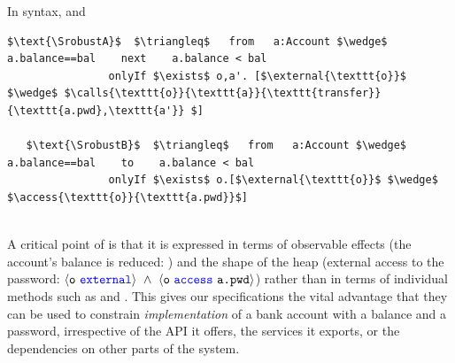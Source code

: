 In \Nec  syntax, and 
 

%
%
%
%
%
%
\begin{lstlisting}[language = Chainmail, mathescape=true, frame=lines]
   $\text{\SrobustA}$  $\triangleq$   from   a:Account $\wedge$ a.balance==bal    next    a.balance < bal
                onlyIf $\exists$ o,a'. [$\external{\texttt{o}}$ $\wedge$ $\calls{\texttt{o}}{\texttt{a}}{\texttt{transfer}}{\texttt{a.pwd},\texttt{a'}} $]    
                
   $\text{\SrobustB}$  $\triangleq$   from   a:Account $\wedge$ a.balance==bal    to    a.balance < bal
                onlyIf $\exists$ o.[$\external{\texttt{o}}$ $\wedge$ $\access{\texttt{o}}{\texttt{a.pwd}}$]    
           
\end{lstlisting}
%
%
% 


A critical point of \SrobustB %
is that it is
expressed in terms of observable effects (the account's balance is
reduced: ) and the shape of the heap 
(external access to the password:
$\external{\prg{o}}\ \wedge\ \access{\prg{o}}{\prg{a.pwd}}$) 
rather than in terms of individual methods such as
 and .
This gives our specifications the
vital advantage that they can be used to constrain
\textit{implementation} of a bank account with a balance and a
password, irrespective of the API it
offers, the services it exports, or the dependencies on other parts of
the system.

